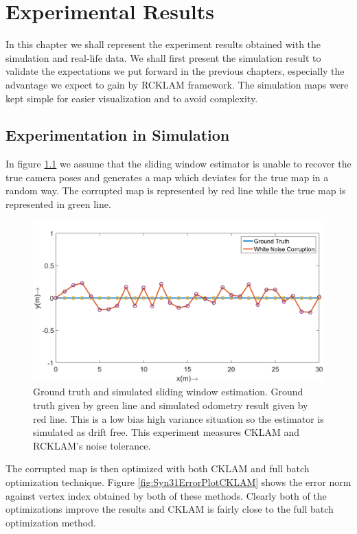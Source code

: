 \chapter{Experimental Results}
\label{chap:ExptAndResults}
  In this chapter we shall represent the experiment results obtained with the simulation and real-life data. We shall first present the simulation result to validate the expectations we put forward in the previous chapters, especially the advantage we expect to gain by RCKLAM framework. The simulation maps were kept simple for easier visualization and to avoid complexity.
  
\section{Experimentation in Simulation}
\label{sec:SimulationExpt}

  In figure \ref{fig:Syn31Map} we assume that the sliding window estimator is unable to recover the true camera poses and generates a map which deviates for the true map in a random way. The corrupted map is represented by red line while the true map is represented in green line.
  
  
\begin{figure}
  \centering
    \includegraphics[width=1.00\textwidth]{images/Syn31_map.png}
  \caption{Ground truth and simulated sliding window estimation. Ground truth given by green line and simulated odometry result given by red line. This is a low bias high variance situation so the estimator is simulated as drift free. This experiment measures CKLAM and RCKLAM's noise tolerance.}
  \label{fig:Syn31Map}
\end{figure}
  
  
  The corrupted map is then optimized with both CKLAM and full batch optimization technique. Figure \ref{fig:Syn31ErrorPlotCKLAM} shows the error norm against vertex index obtained by both of these methods. Clearly both of the optimizations improve the results and CKLAM is fairly close to the full batch optimization method. 
  
